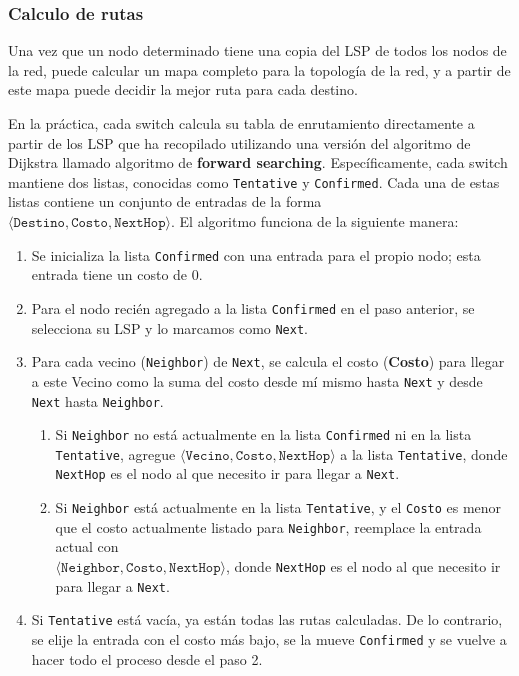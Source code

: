 \subsubsection{Calculo de rutas}
Una vez que un nodo determinado tiene una copia del LSP de todos los nodos de la red, puede calcular un mapa completo para la topología de la red, y a partir de este mapa puede decidir la mejor ruta para cada destino.

En la práctica, cada switch calcula su tabla de enrutamiento directamente a partir de los LSP que ha recopilado utilizando una versión del algoritmo de Dijkstra llamado algoritmo de \textbf{forward searching}. Específicamente, cada switch mantiene dos listas, conocidas como \texttt{Tentative} y \texttt{Confirmed}. Cada una de estas listas contiene un conjunto de entradas de la forma \\ \(\langle \texttt{Destino}, \texttt{Costo}, \texttt{NextHop}\rangle\). El algoritmo funciona de la siguiente manera:
\begin{enumerate}
  \item Se inicializa la lista \texttt{Confirmed} con una entrada para el propio nodo; esta entrada tiene un costo de 0.
  \item Para el nodo recién agregado a la lista \texttt{Confirmed} en el paso anterior,  se selecciona su LSP y lo marcamos como \texttt{Next}.
  \item Para cada vecino (\texttt{Neighbor}) de \texttt{Next}, se calcula el costo (\textbf{Costo}) para llegar a este Vecino como la suma del costo desde mí mismo hasta \texttt{Next} y desde \texttt{Next} hasta \texttt{Neighbor}.
  \begin{enumerate}
    \item Si \texttt{Neighbor} no está actualmente en la lista \texttt{Confirmed}  ni en la lista \texttt{Tentative}, agregue \(\langle\texttt{Vecino}, \texttt{Costo}, \texttt{NextHop}\rangle\) a la lista \texttt{Tentative}, donde \texttt{NextHop} es el nodo al que necesito ir para llegar a \texttt{Next}.
    \item Si \texttt{Neighbor} está actualmente en la lista \texttt{Tentative}, y el \texttt{Costo} es menor que el costo actualmente listado para \texttt{Neighbor}, reemplace la entrada actual con \\ \(\langle\texttt{Neighbor}, \texttt{Costo}, \texttt{NextHop}\rangle\), donde \texttt{NextHop} es el nodo al que necesito ir para llegar a \texttt{Next}.
  \end{enumerate}
  \item Si \texttt{Tentative} está vacía, ya están todas las rutas calculadas. De lo contrario, se elije la entrada con el costo más bajo, se la mueve \texttt{Confirmed} y se vuelve a hacer todo el proceso desde el paso 2.
\end{enumerate}

